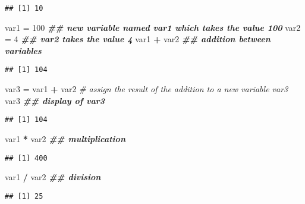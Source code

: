 \documentclass[
]{article}
\newenvironment{Shaded}{\begin{snugshade}}{\end{snugshade}}
\newcommand{\CommentTok}[1]{\textcolor[rgb]{0.56,0.35,0.01}{\textit{#1}}}
\newcommand{\DecValTok}[1]{\textcolor[rgb]{0.00,0.00,0.81}{#1}}
\newcommand{\DocumentationTok}[1]{\textcolor[rgb]{0.56,0.35,0.01}{\textbf{\textit{#1}}}}
\newcommand{\NormalTok}[1]{#1}
\newcommand{\OtherTok}[1]{\textcolor[rgb]{0.56,0.35,0.01}{#1}}
\newcommand{\SpecialCharTok}[1]{\textcolor[rgb]{0.81,0.36,0.00}{\textbf{#1}}}
\begin{document}
\begin{verbatim}
## [1] 10
\end{verbatim}

\begin{Shaded}
\begin{Highlighting}[]
\NormalTok{var1 }\OtherTok{=} \DecValTok{100} \DocumentationTok{\#\# new variable named var1 which takes the value 100}
\NormalTok{var2 }\OtherTok{=} \DecValTok{4} \DocumentationTok{\#\# var2 takes the value 4}
\NormalTok{var1 }\SpecialCharTok{+}\NormalTok{ var2 }\DocumentationTok{\#\# addition between variables}
\end{Highlighting}
\end{Shaded}

\begin{verbatim}
## [1] 104
\end{verbatim}

\begin{Shaded}
\begin{Highlighting}[]
\NormalTok{var3 }\OtherTok{=}\NormalTok{ var1 }\SpecialCharTok{+}\NormalTok{ var2 }\CommentTok{\# assign the result of the addition to a new variable var3}
\NormalTok{var3 }\DocumentationTok{\#\# display of var3}
\end{Highlighting}
\end{Shaded}

\begin{verbatim}
## [1] 104
\end{verbatim}

\begin{Shaded}
\begin{Highlighting}[]
\NormalTok{var1 }\SpecialCharTok{*}\NormalTok{ var2 }\DocumentationTok{\#\# multiplication}
\end{Highlighting}
\end{Shaded}

\begin{verbatim}
## [1] 400
\end{verbatim}

\begin{Shaded}
\begin{Highlighting}[]
\NormalTok{var1 }\SpecialCharTok{/}\NormalTok{ var2 }\DocumentationTok{\#\# division}
\end{Highlighting}
\end{Shaded}

\begin{verbatim}
## [1] 25
\end{verbatim}
\end{document}
